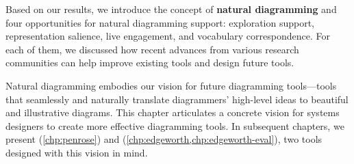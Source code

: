 Based on our results, we introduce the concept of \textbf{natural diagramming} and four opportunities for natural diagramming support: exploration support, representation salience, live engagement, and vocabulary correspondence. For each of them, we discussed how recent advances from various research communities can help improve existing tools and design future tools.


Natural diagramming embodies our vision for future diagramming tools---tools that seamlessly and naturally translate diagrammers' high-level ideas to beautiful and illustrative diagrams. This chapter articulates a concrete vision for systems designers to create more effective diagramming tools. In subsequent chapters, we present \Penrose{} (\cref{chp:penrose}) and \Edgeworth{} (\cref{chp:edgeworth,chp:edgeworth-eval}), two tools designed with this vision in mind.
